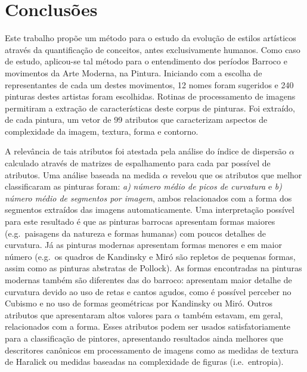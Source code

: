 
\afterpage{\blankpage}
\chapter{Conclusões}
\label{chap:conclusoes}

Este trabalho propõe um método para o estudo da evolução de estilos
artísticos através da quantificação de conceitos, antes exclusivamente
humanos. Como caso de estudo, aplicou-se tal método para o entendimento
dos períodos Barroco e movimentos da Arte Moderna, na
Pintura. Iniciando com a escolha de representantes de cada um destes
movimentos, 12 nomes foram sugeridos e 240 pinturas destes artistas foram
escolhidas. Rotinas de processamento de imagens permitiram a
extração de características deste corpus de pinturas. Foi extraído, de
cada pintura, um vetor de 99 atributos que caracterizam aspectos de
complexidade da imagem, textura, forma e contorno.  

A relevância de tais atributos foi atestada pela análise do índice de
dispersão $\alpha$ calculado através de matrizes de espalhamento para
cada par possível de atributos. Uma análise baseada na medida $\alpha$
revelou que os atributos que melhor classificaram as pinturas foram:
\textit{a)} \emph{número médio de picos de curvatura} e \textit{b)}
\emph{número médio de segmentos por imagem}, ambos relacionados com a
forma dos segmentos extraídos das imagens automaticamente. Uma
interpretação possível para este resultado é que as pinturas barrocas
apresentam formas maiores (e.g.\ paisagens da natureza e formas
humanas) com poucos detalhes de curvatura. Já as pinturas modernas
apresentam formas menores e em maior número (e.g.\ os quadros de
Kandinsky e Miró são repletos de pequenas formas, assim como as
pinturas abstratas de Pollock). As formas encontradas na pinturas
modernas também são diferentes das do barroco: apresentam maior
detalhe de curvatura devido ao uso de retas e cantos agudos, como é
possível perceber no Cubismo e no uso de formas geométricas por
Kandinsky ou Miró. Outros atributos que apresentaram altos valores para
$\alpha$ também estavam, em geral, relacionados com a forma. Esses
atributos podem ser usados satisfatoriamente para a classificação de
pintores, apresentando resultados ainda melhores que descritores
canônicos em processamento de imagens como as medidas de textura de
Haralick ou medidas baseadas na complexidade de figuras
(i.e.\ entropia).

